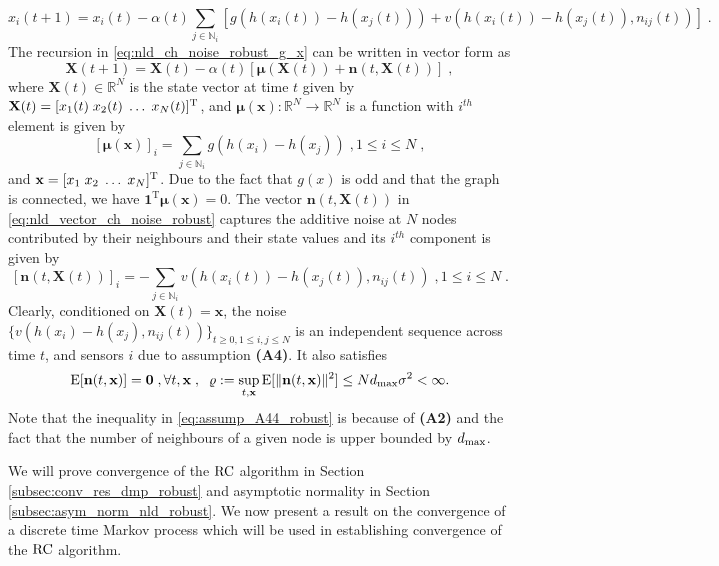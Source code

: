 \documentclass[onecolumn, draft, 12pt]{IEEEtran}
\newcommand{\vrho}{\ensuremath{\varrho}}
\newcommand{\E}{{\rm E}}
\newcommand{\Rn}{\mathbb{R}^{N}}
\newcommand{\rnld}{\rm RC}
\newcommand{\onevectT}{\mathbf{1}^{\mathrm{T}}}
\newcommand{\x}{\mathbf{x}}
\newcommand{\X}{\mathbf{X}}
\newcommand{\xX}{\mathbf{x}}
\newcommand{\mx}{\mathbf{\boldsymbol\mu}(\mathbf{x})}
\newcommand{\mXt}{\mathbf{\boldsymbol\mu}(\mathbf{X}(t))}
\newcommand{\nv}{\mathbf{n}}
\newcommand{\itN}{1 \leq i \leq N}
\begin{document}
\begin{equation}
\label{eq:nld_ch_noise_robust_g_x}
 x_{i}(t+1) = x_{i}(t) - \alpha(t) \displaystyle\sum_{j \in \mathbb{N}_{i} } \left [ g(h(x_i(t))-h(x_{j}(t)))  +  v( h(x_i(t))-h(x_{j}(t)), n_{ij}(t) ) \right ] \;.
\end{equation}
The recursion in \eqref{eq:nld_ch_noise_robust_g_x} can be written in vector form as
\begin{equation} 
\label{eq:nld_vector_ch_noise_robust}
\X(t+1) = \X(t) - \alpha(t) \left [ \mXt + \nv(t, \X(t)) \right ]\;,
\end{equation}
where $\mathbf{X}(t) \in \Rn$ is the state vector at time $t$ given by $\mathbf{X}(t)=[x_{1}(t) \; x_{2}(t) \; \ldots \; x_{N}(t)]^{\rm T}$, and $\boldsymbol\mu(\x): \Rn \rightarrow \Rn$ is a function with $i^{th}$ element is given by
\begin{equation}
\label{eq:nld_mu_comp_robust}
[\boldsymbol\mu(\x)]_{i} =  \displaystyle\sum_{j \in \mathbb{N}_{i}} g(h(x_i)-h(x_{j}))  \;, \itN \;,
\end{equation}
and $\xX=[x_{1} \; x_{2} \; \ldots \; x_{N}]^{\rm T}$. Due to the fact that $g(x)$ is odd and that the graph is connected, we have $\onevectT \mx=0$. The vector $\nv(t,\X(t))$ in \eqref{eq:nld_vector_ch_noise_robust} captures the additive noise at $N$ nodes contributed by their neighbours and their state values and its $i^{th}$ component is given by
\begin{equation} 
\label{eq:nld_ch_noise_comp_robust}
[\nv(t,\X(t))]_{i}=  - \displaystyle\sum_{j \in \mathbb{N}_{i}} v( h(x_i(t))-h(x_{j}(t)), n_{ij}(t) )  \;, \itN \;.
\end{equation}
Clearly, conditioned on $\X(t)=\x$, the noise $\{ v( h(x_i)-h(x_{j}), n_{ij}(t) ) \}_{t\geq 0, 1\leq i,j \leq N}$ is an independent sequence across time $t$, and sensors $i$ due to assumption \textbf{(A4)}. It also satisfies
\begin{align}
\label{eq:assump_A44_robust}
\E [\nv(t, \x)]  = \mathbf{0} \;, \forall t, \x \;, \; \; \vrho:= \sup_{t,\x} \E [\| \nv(t, \x) \|^2] \leq N d_{\rm max} \sigma^2 < \infty.
\end{align}
Note that the inequality in \eqref{eq:assump_A44_robust} is because of \textbf{(A2)} and the fact that the number of neighbours of a given node is upper bounded by $d_{\rm max}$.

We will prove convergence of the $\rnld$ algorithm in Section \ref{subsec:conv_res_dmp_robust} and asymptotic normality in Section \ref{subsec:asym_norm_nld_robust}. We now present a result on the convergence of a discrete time Markov process which will be used in establishing convergence of the $\rnld$ algorithm. 
\end{document}

